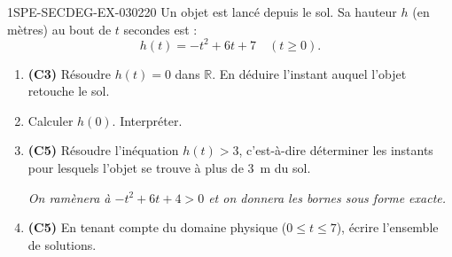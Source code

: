 \begin{exercice}{1SPE-SECDEG-EX-030}{2}{20}
Un objet est lancé depuis le sol. Sa hauteur $h$ (en mètres) au bout de $t$ secondes est :
\[h(t) = -t^2 + 6t + 7 \quad (t \geqslant 0).\]

\begin{enumerate}
  \item \textbf{(C3)} Résoudre $h(t) = 0$ dans $\mathbb{R}$. En déduire l'instant auquel l'objet retouche le sol.
  \item Calculer $h(0)$. Interpréter.
  \item \textbf{(C5)} Résoudre l'inéquation $h(t) > 3$, c'est-à-dire déterminer les instants pour lesquels l'objet se trouve à plus de $3$~m du sol.

  \textit{On ramènera à $-t^2 + 6t + 4 > 0$ et on donnera les bornes sous forme exacte.}

  \item \textbf{(C5)} En tenant compte du domaine physique ($0 \leqslant t \leqslant 7$), écrire l'ensemble de solutions.
\end{enumerate}
\end{exercice}
